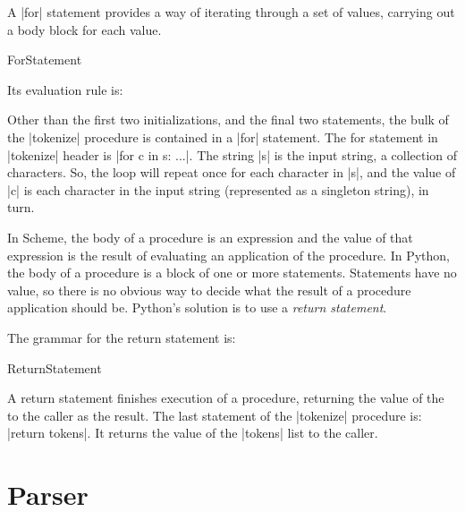   A \pycode|for| statement provides a way of iterating through a set of values, carrying out a body block for each value.  
\begin{bnfgrammarm}{ForStatement}
\end{bnfgrammarm}
Its evaluation rule is:

Other than the first two initializations, and the final two statements, the bulk of the \pycode|tokenize| procedure is contained in a \pycode|for| statement.  The for statement in \pycode|tokenize| header is \pycode|for c in s: ...|.  The string \pycode|s| is the input string, a collection of characters.  So, the loop will repeat once for each character in \pycode|s|, and the value of \pycode|c| is each character in the input string (represented as a singleton string), in turn.  

 In Scheme, the body of a procedure is an expression and the value of that expression is the result of evaluating an application of the procedure.  In Python, the body of a procedure is a block of one or more statements.  Statements have no value, so there is no obvious way to decide what the result of a procedure application should be.  Python's solution is to use a \emph{return statement}.  

The grammar for the return statement is:
\begin{bnfgrammarm}{ReturnStatement}
\end{bnfgrammarm}
A return statement finishes execution of a procedure, returning the value of the  to the caller as the result.  The last statement of the \pycode|tokenize| procedure is: \pycode|return tokens|.  It returns the value of the \pycode|tokens| list to the caller.

\section{Parser}\label{sec:parser}

